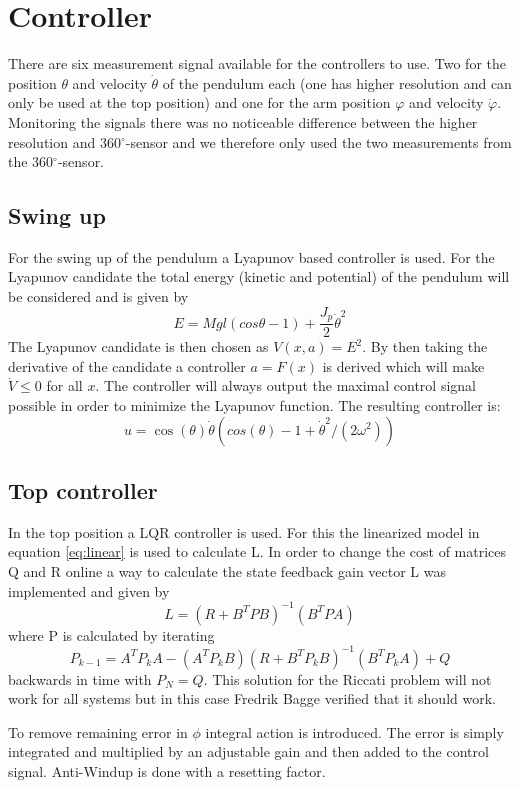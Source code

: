\documentclass[10pt,a4paper]{article}
\begin{document}
\section{Controller}
There are six measurement signal available for the controllers to use. Two for the position $ \theta $ and velocity $ \dot{\theta} $ of the pendulum each (one has higher resolution and can only  be used at the top position) and one for the arm position $ \varphi $ and velocity $ \dot{\varphi} $. Monitoring the signals there was no noticeable difference between the higher resolution and $ 360{^\circ} $-sensor and we therefore only used the two measurements from the $ 360 {^\circ} $-sensor.
\subsection{Swing up}
For the swing up of the pendulum a Lyapunov based controller is used. For the Lyapunov candidate the total energy (kinetic and potential) of the pendulum will be considered and is given by 
\begin{equation}
E= Mgl(cos\theta - 1)+\frac{J_p}{2}\dot\theta^2
\label{eq:energy}
\end{equation}
The Lyapunov candidate is then chosen as $V(x,a)=E^2$. By then taking the derivative of the candidate a controller $a=F(x)$ is derived which will make $\dot V \leq 0$ for all $x$. The controller will always output the maximal control signal possible in order to minimize the Lyapunov function. The resulting controller is:
\begin{equation}
u = \cos(\theta) \dot\theta (cos(\theta) - 1 + \dot{\theta}^2 / (2 \omega^2))
\end{equation}
\subsection{Top controller}
In the top position a LQR controller is used. For this the linearized model in equation \eqref{eq:linear} is used to calculate L. In order to change the cost of matrices Q and R online a way to calculate the state feedback gain vector L was implemented and given by
$$ L = (R+B^TPB)^{-1}(B^TPA) $$
where P is calculated by iterating
$$ P_{k-1} = A^TP_kA-(A^TP_kB)(R+B^TP_kB)^{-1}(B^TP_kA)+Q $$
backwards in time with $P_N = Q$. This solution for the Riccati problem will not work for all systems but in this case Fredrik Bagge verified that it should work.

To remove remaining error in $\phi$ integral action is introduced. The error is simply integrated and multiplied by an adjustable gain and then added to the control signal. Anti-Windup is done with a resetting factor.
\end{document}
